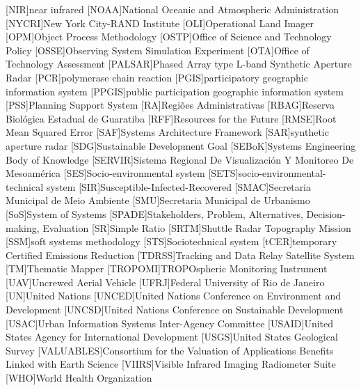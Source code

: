 \begin{acronym}[HyperLEAVES]
[NIR]{near infrared}
[NOAA]{National Oceanic and Atmospheric Administration}
[NYCRI]{New York City-RAND Institute}
[OLI]{Operational Land Imager}
[OPM]{Object Process Methodology}
[OSTP]{Office of Science and Technology Policy}
[OSSE]{Observing System Simulation Experiment}
[OTA]{Office of Technology Assessment}
[PALSAR]{Phased Array type L-band Synthetic Aperture Radar}
[PCR]{polymerase chain reaction}
[PGIS]{participatory geographic information system}
[PPGIS]{public participation geographic information system}
[PSS]{Planning Support System}
[RA]{Regiões Administrativas}
[RBAG]{Reserva Biológica Estadual de Guaratiba}
[RFF]{Resources for the Future}
[RMSE]{Root Mean Squared Error}
[SAF]{Systems Architecture Framework}
[SAR]{synthetic aperture radar}
[SDG]{Sustainable Development Goal}
[SEBoK]{Systems Engineering Body of Knowledge}
[SERVIR]{Sistema Regional De Visualizaci\'{o}n Y Monitoreo De Mesoam\'{e}rica}
[SES]{Socio-environmental system}
[SETS]{socio-environmental-
technical system}
[SIR]{Susceptible-Infected-Recovered}
[SMAC]{Secretaria Municipal de Meio Ambiente}
[SMU]{Secretaria Municipal de Urbanismo}
[SoS]{System of Systems}
[SPADE]{Stakeholders, Problem, Alternatives, Decision-making, Evaluation}
[SR]{Simple Ratio}
[SRTM]{Shuttle Radar Topography Mission}
[SSM]{soft systems methodology}
[STS]{Sociotechnical system}
[tCER]{temporary Certified Emissions Reduction}
[TDRSS]{Tracking and Data Relay Satellite System}
[TM]{Thematic Mapper}
[TROPOMI]{TROPOspheric Monitoring Instrument}
[UAV]{Uncrewed Aerial Vehicle}
[UFRJ]{Federal University of Rio de Janeiro}
[UN]{United Nations}
[UNCED]{United Nations Conference on Environment and Development}
[UNCSD]{United Nations Conference on Sustainable Development}
[USAC]{Urban Information Systems Inter-Agency Committee}
[USAID]{United States Agency for International Development}
[USGS]{United States Geological Survey}
[VALUABLES]{Consortium for the Valuation of Applications Benefits Linked with Earth Science}
[VIIRS]{Visible Infrared Imaging Radiometer Suite}
[WHO]{World Health Organization}






\end{acronym}
